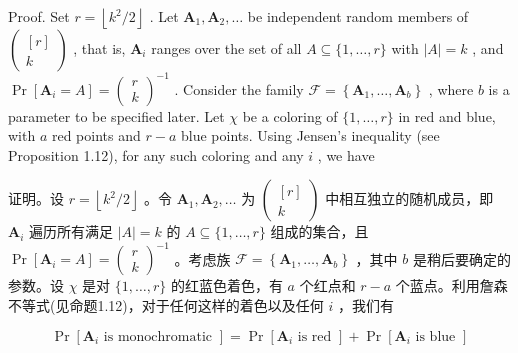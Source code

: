 \documentclass[10pt]{article}
\begin{document}
Proof. Set \(r = \left\lfloor  {{k}^{2}/2}\right\rfloor\) . Let \({\mathbf{A}}_{1},{\mathbf{A}}_{2},\ldots\) be independent random members of \(\left( \begin{matrix} \left\lbrack  r\right\rbrack  \\  k \end{matrix}\right)\) , that is, \({\mathbf{A}}_{i}\) ranges over the set of all \(A \subseteq  \{ 1,\ldots ,r\}\) with \(\left| A\right|  = k\) , and \(\Pr \left\lbrack  {{\mathbf{A}}_{i} = A}\right\rbrack   = {\left( \begin{array}{l} r \\  k \end{array}\right) }^{-1}\) . Consider the family \(\mathcal{F} = \left\{  {{\mathbf{A}}_{1},\ldots ,{\mathbf{A}}_{b}}\right\}\) , where \(b\) is a parameter to be specified later. Let \(\chi\) be a coloring of \(\{ 1,\ldots ,r\}\) in red and blue, with \(a\) red points and \(r - a\) blue points. Using Jensen’s inequality (see Proposition 1.12), for any such coloring and any \(i\) , we have

\begin{tcolorbox}\relax
证明。设 \(r = \left\lfloor  {{k}^{2}/2}\right\rfloor\) 。令 \({\mathbf{A}}_{1},{\mathbf{A}}_{2},\ldots\) 为 \(\left( \begin{matrix} \left\lbrack  r\right\rbrack  \\  k \end{matrix}\right)\) 中相互独立的随机成员，即 \({\mathbf{A}}_{i}\) 遍历所有满足 \(\left| A\right|  = k\) 的 \(A \subseteq  \{ 1,\ldots ,r\}\) 组成的集合，且 \(\Pr \left\lbrack  {{\mathbf{A}}_{i} = A}\right\rbrack   = {\left( \begin{array}{l} r \\  k \end{array}\right) }^{-1}\) 。考虑族 \(\mathcal{F} = \left\{  {{\mathbf{A}}_{1},\ldots ,{\mathbf{A}}_{b}}\right\}\) ，其中 \(b\) 是稍后要确定的参数。设 \(\chi\) 是对 \(\{ 1,\ldots ,r\}\) 的红蓝色着色，有 \(a\) 个红点和 \(r - a\) 个蓝点。利用詹森不等式(见命题1.12)，对于任何这样的着色以及任何 \(i\) ，我们有
\end{tcolorbox}

\[
\Pr \left\lbrack  {{\mathbf{A}}_{i}\text{ is monochromatic }}\right\rbrack   = \Pr \left\lbrack  {{\mathbf{A}}_{i}\text{ is red }}\right\rbrack   + \Pr \left\lbrack  {{\mathbf{A}}_{i}\text{ is blue }}\right\rbrack
\]
\end{document}
